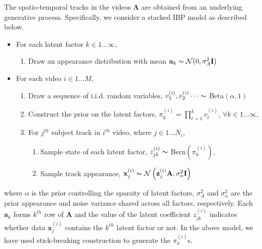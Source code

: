 \documentclass[runningheads]{llncs}
\begin{document}
The spatio-temporal tracks in the videos $ \mathbf{\Lambda}$ are obtained from an underlying generative process. Specifically, we consider a stacked IBP model \cite{shi2014weakly} as described below.
\vspace{-1mm}
\noindent
\begin{itemize}[leftmargin=*,noitemsep]
\item For each latent factor $k \in 1 \dots \infty$,
\begin{enumerate}[leftmargin=*,labelindent=.1cm, labelsep=0.1cm,align=left,noitemsep]
\setlength\itemsep{0em}
\item Draw an appearance distribution with mean $\mathbf{a}_{k} \thicksim \mathcal{N}(0,\sigma_A^2\mathbf{I})$
\end{enumerate}
\item For each video $i \in 1\dots M$,
\begin{enumerate}[leftmargin=*,labelindent=.1cm, labelsep=0.1cm,align=left,noitemsep]
\setlength\itemsep{0em}
\item Draw a sequence of i.i.d. random variables, $v^{(i)}_1, v^{(i)}_2 \dots \thicksim$ Beta$(\alpha,1)$
\item Construct the prior on the latent factors, $\pi_k^{(i)} = \prod_{t=1}^k v_t^{(i)}$, $\forall k \in 1\dots \infty,$
\item For $j^{th}$ subject track in $i^{th}$ video, where $j\in 1 \dots N_i$,
\begin{enumerate}[leftmargin=*,itemindent=.5cm,labelwidth=\itemindent,labelsep=0cm,align=left]
\setlength\itemsep{0em}
\item Sample state of each latent factor, $z_{jk}^{(i)} \thicksim$ Bern$(\pi_k^{(i)})$,
\item Sample track appearance, $\mathbf{x}_j^{(i)} \thicksim \mathcal{N}\left(\mathbf{z}_{j}^{(i)}\mathbf{A},\sigma_n^2\mathbf{I}\right)$ 
\end{enumerate}
\end{enumerate}
\vspace{-1mm}
\end{itemize}
where $\alpha$ is the prior controlling the sparsity of latent factors, $\sigma_A^2$ and $\sigma_n^2$ are the prior appearance and noise variance shared across all factors, respectively. Each $\mathbf{a}_{k}$ forms $k^{th}$ row of $\mathbf{A}$ and the value of the latent coefficient $z_{jk}^{(i)}$ indicates whether data $\mathbf{x}_j^{(i)}$ contains the $k^{th}$ latent factor or not. In the above model, we have used stick-breaking construction \cite{doshi2009variational} to generate the $\pi_k^{(i)}$s.
\end{document}
